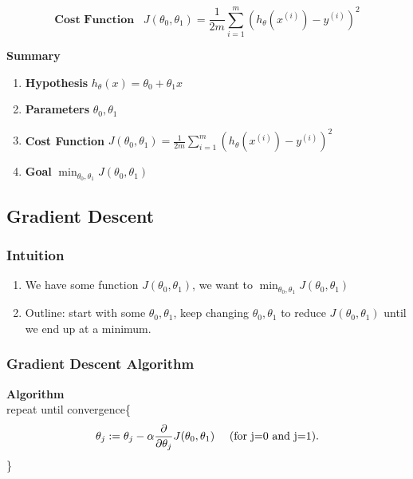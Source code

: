       \begin{equation} 
          \boxed{ 
              \textbf{Cost Function}\hspace{10pt} J(\theta_0, \theta_1) = \frac{1}{2m} \sum_{i=1}^{m} (h_\theta(x^{(i)}) - y^{(i)} )^2
      }
          \label{eq:cost}
      \end{equation}
      

      \par \textbf{Summary} 
      \begin{enumerate}
          \item \textbf{Hypothesis  }$h_\theta (x) = \theta_0 + \theta_1x$
          \item \textbf{Parameters } $\theta_0, \theta_1$
          \item \textbf{Cost Function }$J(\theta_0, \theta_1) = \frac{1}{2m} \sum_{i=1}^{m} (h_\theta(x^{(i)}) - y^{(i)} )^2$
          \item \textbf{Goal } $\min_{\theta_0, \theta_1} J(\theta_0, \theta_1)$
    
      \end{enumerate}
        

          
   
    
    \subsection{Gradient Descent}
        \subsubsection{Intuition}
            \begin{enumerate}
                \item We have some function $J(\theta_0, \theta_1)$, we want to $\min_{\theta_0, \theta_1} J (\theta_0, \theta_1)$
                \item Outline: start with some $\theta_0, \theta_1$, keep changing  $\theta_0, \theta_1$ to reduce $J(\theta_0, \theta_1)$ until we end up at a minimum. 
            \end{enumerate}
        \subsubsection{Gradient Descent Algorithm}
            \textbf{Algorithm} \\
                repeat until convergence\{  
                    \[ \theta_j := \theta_j - \alpha \frac{\partial }{\partial \theta_j} J(\theta_0, \theta_1)\mbox{\hspace{10pt} (for j=0 and j=1)} 
                   .\] \}
        \\



